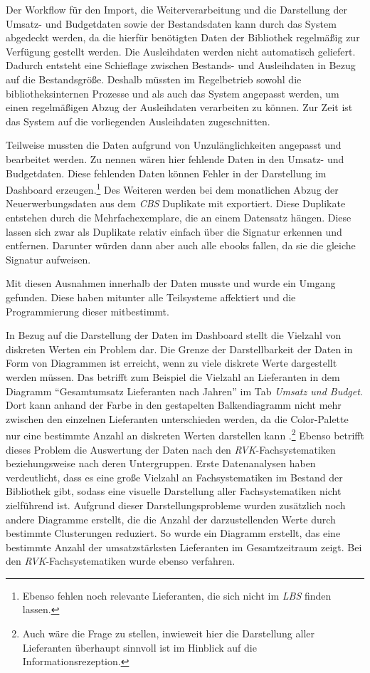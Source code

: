 Der Workflow für den Import, die Weiterverarbeitung und die Darstellung der Umsatz- und Budgetdaten sowie der Bestandsdaten kann durch das System
abgedeckt werden, da die hierfür benötigten Daten der Bibliothek regelmäßig zur Verfügung gestellt werden. Die Ausleihdaten werden nicht automatisch
geliefert. Dadurch entsteht eine Schieflage zwischen Bestands- und Ausleihdaten in Bezug auf die Bestandsgröße.
Deshalb müssten im Regelbetrieb sowohl die bibliotheksinternen Prozesse und als auch das System angepasst werden, um einen regelmäßigen Abzug der Ausleihdaten
verarbeiten zu können. Zur Zeit ist das System auf die vorliegenden Ausleihdaten zugeschnitten.

Teilweise mussten die Daten aufgrund von Unzulänglichkeiten angepasst und bearbeitet werden.
Zu nennen wären hier fehlende Daten in den Umsatz- und Budgetdaten. Diese fehlenden Daten können Fehler in der Darstellung im Dashboard erzeugen.\footnote{Ebenso fehlen noch relevante Lieferanten, die sich nicht im \textit{\acrshort{LBS}} finden lassen.}
Des Weiteren werden bei dem monatlichen Abzug der Neuerwerbungsdaten aus dem \textit{\acrshort{CBS}} Duplikate mit exportiert. Diese Duplikate entstehen durch
die Mehrfachexemplare, die an einem Datensatz hängen. Diese lassen sich zwar als Duplikate relativ einfach über die Signatur erkennen und entfernen.
Darunter würden dann aber auch alle ebooks fallen, da sie die gleiche Signatur aufweisen.

Mit diesen Ausnahmen innerhalb der Daten musste und wurde ein Umgang gefunden. Diese haben mitunter alle Teilsysteme affektiert und
die Programmierung dieser mitbestimmt.

In Bezug auf die Darstellung der Daten im Dashboard stellt die Vielzahl von diskreten Werten ein Problem dar. 
Die Grenze der Darstellbarkeit der Daten in Form von Diagrammen ist erreicht, wenn zu viele diskrete Werte dargestellt werden müssen.
Das betrifft zum Beispiel die Vielzahl an Lieferanten in dem Diagramm \enquote{Gesamtumsatz Lieferanten nach Jahren} im Tab \textit{Umsatz und Budget}. 
Dort kann anhand der Farbe in den gestapelten Balkendiagramm nicht mehr zwischen den einzelnen Lieferanten unterschieden werden, da die Color-Palette 
nur eine bestimmte Anzahl an diskreten Werten darstellen kann \cite[vgl.][]{plotly_discrete_2021}.\footnote{Auch wäre die Frage zu stellen, inwieweit hier die Darstellung aller Lieferanten 
überhaupt sinnvoll ist im Hinblick auf die Informationsrezeption.}
Ebenso betrifft dieses Problem die Auswertung der Daten nach den \textit{\acrshort{RVK}}-Fachsystematiken beziehungsweise nach deren Untergruppen. 
Erste Datenanalysen haben verdeutlicht, dass es eine große Vielzahl an Fachsystematiken im Bestand der Bibliothek gibt, sodass eine visuelle Darstellung aller Fachsystematiken nicht zielführend ist.
Aufgrund dieser Darstellungsprobleme wurden zusätzlich noch andere Diagramme erstellt, die die Anzahl der darzustellenden Werte durch bestimmte Clusterungen reduziert.
So wurde ein Diagramm erstellt, das eine bestimmte Anzahl der umsatzstärksten Lieferanten im Gesamtzeitraum zeigt. Bei den \textit{\acrshort{RVK}}-Fachsystematiken wurde ebenso
verfahren.



